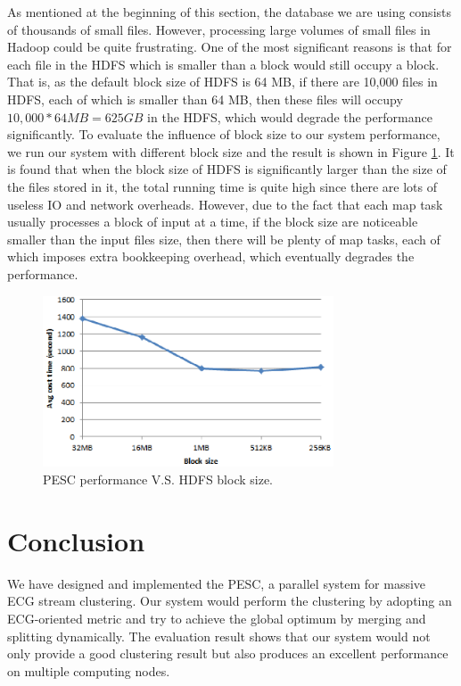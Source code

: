 \documentclass[conference]{IEEEtran}
\begin{document}
As mentioned at the beginning of this section, the database we are using consists of thousands of small files. However, processing large volumes of small files in Hadoop could be quite frustrating. One of the most significant reasons is that for each file in the HDFS which is smaller than a block would still occupy a block. That is, as the default block size of HDFS is 64 MB, if there are 10,000 files in HDFS, each of which is smaller than 64 MB, then these files will occupy $ 10,000 * 64 MB = 625 GB $ in the HDFS, which would degrade the performance significantly. To evaluate the influence of block size to our system performance, we run our system with different block size and the result is shown in Figure \ref{fig_block_size}. It is found that when the block size of HDFS is significantly larger than the size of the files stored in it, the total running time is quite high since there are lots of useless IO and network overheads. However, due to the fact that each map task usually processes a block of input at a time, if the block size are noticeable smaller than the input files size, then there will be plenty of map tasks, each of which imposes extra bookkeeping overhead, which eventually degrades the performance.
\begin{figure}[!t]
\centering
\includegraphics[height=2.0in]{./Figure/block_size.eps}
\caption{PESC performance V.S. HDFS block size.}
\label{fig_block_size}
\end{figure}



\section{Conclusion}
We have designed and implemented the PESC, a parallel system for massive ECG stream clustering. Our system would perform the clustering by adopting an ECG-oriented metric and try to achieve the global optimum by merging and splitting dynamically. The evaluation result shows that our system would not only provide a good clustering result but also produces an excellent performance on multiple computing nodes.
\end{document}
